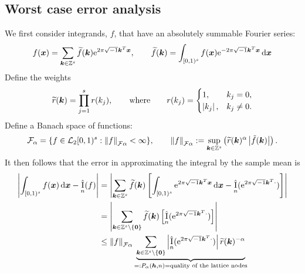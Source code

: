 \documentclass{amsart}
\newcommand{\tr}{\widetilde{r}}
\newcommand{\appxintn}{\appxint_n}
\DeclareMathOperator{\appxint}{\hat{I}}
\begin{document}
\subsection{Worst case error analysis}
We first consider integrands, $f$, that have an absolutely summable Fourier series:
\begin{equation} \label{eq:fseries}
    f(\boldsymbol{x}) = \sum_{\boldsymbol{k} \in \mathbb{Z}^s} \widetilde{f}(\boldsymbol{k}) \mathrm{e}^{2 \pi \sqrt{-1} \boldsymbol{k}^T \boldsymbol{x}}, \qquad \widetilde{f}(\boldsymbol{k}) = \int_{[0,1)^s} f(\boldsymbol{x}) \mathrm{e}^{-2 \pi \sqrt{-1} \boldsymbol{k}^T \boldsymbol{x}}\, {\rm d} \boldsymbol{x}
\end{equation}
Define the weights
\begin{equation}
\tr(\vk) = \prod_{j=1}^{s} r(k_{j}),
\qquad \text{where} \qquad r(k_{j})=\begin{cases} 1, &
k_{j}=0, \\ \abs{k_{j}}, & k_{j} \ne 0.  \end{cases}
\end{equation}
Define a Banach
space of functions:
$$
\cf_{\alpha} = \{ f \in \cl_2[0,1)^s :
\norm[\cf{\alpha}]{f} < \infty \}, \qquad
\norm[\cf{\alpha}]{f} := \sup_{\vk \in \integers^{s}}
\left(\tr(\vk)^{\alpha} \abs{\tilde{f}(\vk)} \right).
$$
It then follows that the error in approximating the integral by the sample mean is
\begin{align} \label{eq:wcerrPalpha}
\abs{\int_{[0,1)^s} f(\vx) \, \dif \vx - \appxint_n(f)} &
= \abs{\sum_{\vk \in \integers^s} \tf(\vk) \left[\int_{[0,1)^s} \me^{2 \pi \sqrt{-1} \vk^T \vx} \, \dif \vx - \appxintn(\me^{2 \pi \sqrt{-1} \vk^T \cdot})\right]} \\
\nonumber
& = \abs{\sum_{\vk \in \integers^s \setminus\{\vzero\}} \tf(\vk) \left[ \appxintn(\me^{2 \pi \sqrt{-1} \vk^T \cdot})\right]} \\
\nonumber
& \le \norm[\cf{\alpha}]{f} \underbrace{\sum_{\vk \in \integers^s \setminus\{\vzero\}} \abs{\appxint_n(\me^{2 \pi \sqrt{-1} \vk^T \cdot})}\tr(\vk)^{-\alpha}}_{=: P_\alpha(\vh,n) = \text{quality of the lattice nodes}} \\
\nonumber
\end{align}
\end{document}
